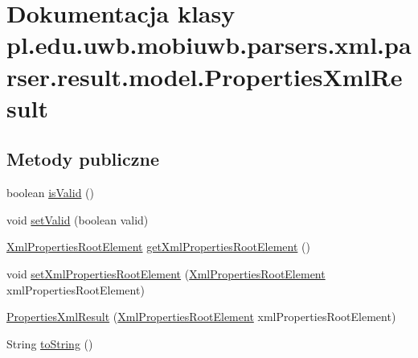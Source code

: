 \hypertarget{classpl_1_1edu_1_1uwb_1_1mobiuwb_1_1parsers_1_1xml_1_1parser_1_1result_1_1model_1_1_properties_xml_result}{}\section{Dokumentacja klasy pl.\+edu.\+uwb.\+mobiuwb.\+parsers.\+xml.\+parser.\+result.\+model.\+Properties\+Xml\+Result}
\label{classpl_1_1edu_1_1uwb_1_1mobiuwb_1_1parsers_1_1xml_1_1parser_1_1result_1_1model_1_1_properties_xml_result}
\subsection*{Metody publiczne}
\begin{DoxyCompactItemize}
\item 
boolean \hyperlink{classpl_1_1edu_1_1uwb_1_1mobiuwb_1_1parsers_1_1xml_1_1parser_1_1result_1_1model_1_1_properties_xml_result_aa7ca16f51de824932eef5b168ce6296b}{is\+Valid} ()
\item 
void \hyperlink{classpl_1_1edu_1_1uwb_1_1mobiuwb_1_1parsers_1_1xml_1_1parser_1_1result_1_1model_1_1_properties_xml_result_a35e1aa1c7248a374c674392199710364}{set\+Valid} (boolean valid)
\item 
\hyperlink{classpl_1_1edu_1_1uwb_1_1mobiuwb_1_1parsers_1_1xml_1_1model_1_1_xml_properties_root_element}{Xml\+Properties\+Root\+Element} \hyperlink{classpl_1_1edu_1_1uwb_1_1mobiuwb_1_1parsers_1_1xml_1_1parser_1_1result_1_1model_1_1_properties_xml_result_a8d7957c99e42c65463a7ba52c4472fd8}{get\+Xml\+Properties\+Root\+Element} ()
\item 
void \hyperlink{classpl_1_1edu_1_1uwb_1_1mobiuwb_1_1parsers_1_1xml_1_1parser_1_1result_1_1model_1_1_properties_xml_result_a6010c23400d3040f3bb824fc3b87e8c1}{set\+Xml\+Properties\+Root\+Element} (\hyperlink{classpl_1_1edu_1_1uwb_1_1mobiuwb_1_1parsers_1_1xml_1_1model_1_1_xml_properties_root_element}{Xml\+Properties\+Root\+Element} xml\+Properties\+Root\+Element)
\item 
\hyperlink{classpl_1_1edu_1_1uwb_1_1mobiuwb_1_1parsers_1_1xml_1_1parser_1_1result_1_1model_1_1_properties_xml_result_a107157a97d3e5769a9ac46f4cacf7f0f}{Properties\+Xml\+Result} (\hyperlink{classpl_1_1edu_1_1uwb_1_1mobiuwb_1_1parsers_1_1xml_1_1model_1_1_xml_properties_root_element}{Xml\+Properties\+Root\+Element} xml\+Properties\+Root\+Element)
\item 
String \hyperlink{classpl_1_1edu_1_1uwb_1_1mobiuwb_1_1parsers_1_1xml_1_1parser_1_1result_1_1model_1_1_properties_xml_result_a3b8744e63f25930ebd749c6e167dc256}{to\+String} ()
\end{DoxyCompactItemize}
